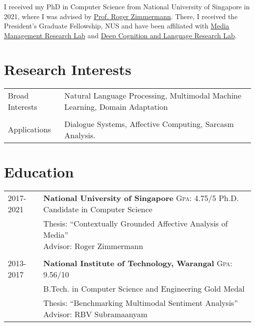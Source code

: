 \documentclass[a4paper,10pt]{article}
\begin{document}
I received my PhD in Computer Science from National University of Singapore in 2021, where I was advised by \href{https://www.comp.nus.edu.sg/~rogerz/roger.html}{Prof. Roger Zimmermann}. There, I received the President’s Graduate Fellowship, NUS and have been affiliated with \href{https://eiger.ddns.comp.nus.edu.sg/}{Media Management Research Lab} and \href{https://declare-lab.github.io/}{Deep Cognition and Language Research Lab}.
\bigskip

\section{Research Interests}
\vspace{0.1cm}

\begin{tabular}{R{2cm}| L{11cm}}
    Broad Interests& Natural Language Processing, \newline Multimodal Machine Learning, \newline Domain Adaptation\\ 
    & \\
    Applications& Dialogue Systems, Affective Computing, Sarcasm Analysis.
\end{tabular}


\section{Education}
\vspace{0.1cm}

\begin{tabular}{R{2cm}| L{11cm}}
    \textsc{2017-2021} & \textbf{National University of Singapore} \hfill \textsc{Gpa}: 4.75/5  
    \newline Ph.D. Candidate in Computer Science\\
    & \small \small{Thesis: ``Contextually Grounded Affective Analysis of Media'' \newline Advisor: Roger Zimmermann}\\
     \\
    2013-2017& \textbf{National Institute of Technology, Warangal}  \hfill \textsc{Gpa}: 9.56/10  \\
    & B.Tech. in Computer Science and Engineering \hfill \small{Gold Medal}\\
    & \small{Thesis: ``Benchmarking Multimodal Sentiment Analysis'' \newline Advisor: RBV Subramaanyam}\\
\end{tabular}
\end{document}
